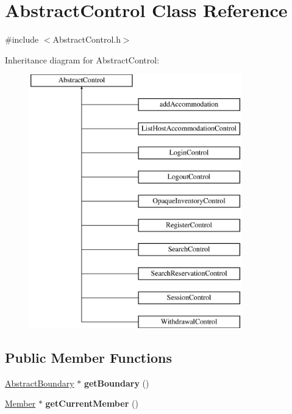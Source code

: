 \hypertarget{class_abstract_control}{}\section{Abstract\+Control Class Reference}
\label{class_abstract_control}


{\ttfamily \#include $<$Abstract\+Control.\+h$>$}

Inheritance diagram for Abstract\+Control\+:\begin{figure}[H]
\begin{center}
\leavevmode
\includegraphics[height=11.000000cm]{class_abstract_control}
\end{center}
\end{figure}
\subsection*{Public Member Functions}
\begin{DoxyCompactItemize}
\item 
\mbox{\label{class_abstract_control_a01dbe49782ca39665619e8d254d9df7f}} 
\mbox{\hyperlink{class_abstract_boundary}{Abstract\+Boundary}} $\ast$ {\bfseries get\+Boundary} ()
\item 
\mbox{\label{class_abstract_control_a8d4de279a0a6209c60ca14678507d993}} 
\mbox{\hyperlink{class_member}{Member}} $\ast$ {\bfseries get\+Current\+Member} ()
\end{DoxyCompactItemize}
